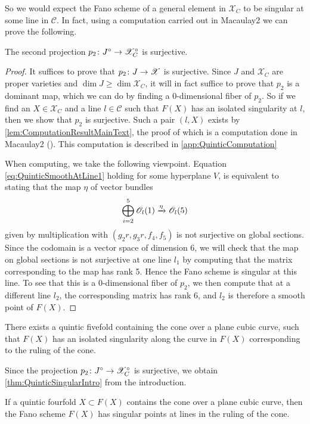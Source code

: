 So we would expect the Fano scheme of a general element in $\mathscr{X}_C$ to be singular at some line in $\mathcal{C}$. In fact, using a computation carried out in Macaulay2 we can prove the following.
\begin{proposition}
  \label{prop:QuinticDominant}
  The second projection $p_2 \colon J^\circ \to \mathscr{X}_C^\circ$ is surjective.
\end{proposition}
\begin{proof}
  It suffices to prove that $p_2 \colon J \to \mathscr{X}$ is surjective. Since $J$ and $\mathscr{X}_C$ are proper varieties and $\dim J \geq \dim \mathscr{X}_C$, it will in fact suffice to prove that $p_2$ is a dominant map, which we can do by finding a $0$-dimensional fiber of $p_2$. So if we find an $X \in \mathscr{X}_C$ and a line $l \in \mathcal{C}$ such that $F(X)$ has an isolated singularity at $l$, then we show that $p_2$ is surjective. Such a pair $(l,X)$ exists by \cref{lem:ComputationResultMainText}, the proof of which is a computation done in Macaulay2 (\cite{Macaulay2}). This computation is described in \cref{app:QuinticComputation}
  
  When computing, we take the following viewpoint. Equation \eqref{eq:QuinticSmoothAtLine1} holding for some hyperplane $V$, is equivalent to stating that the map $\eta$ of vector bundles
  \begin{equation}
  	\label{eq:QuinticSmoothVectorBundleCondition}
  	 \bigoplus_{i=2}^5\mathscr{O}_l(1) \xrightarrow{\eta} \mathscr{O}_l(5) 
  \end{equation}
  given by multiplication with $(g_2r,g_3r,f_4,f_5)$ is not surjective on global sections. Since the codomain is a vector space of dimension 6, we will check that the map on global sections is not surjective at one line $l_1$ by computing that the matrix corresponding to the map has rank 5. Hence the Fano scheme is singular at this line. To see that this is a $0$-dimensional fiber of $p_2$, we then compute that at a different line $l_2$, the corresponding matrix has rank 6, and $l_2$ is therefore a smooth point of $F(X)$.
\end{proof}

\begin{lemma}
	\label{lem:ComputationResultMainText}
	There exists a quintic fivefold containing the cone over a plane cubic curve, such that $F(X)$ has an isolated singularity along the curve in $F(X)$ corresponding to the ruling of the cone.
\end{lemma}

Since the projection $p_2 \colon J^\circ \to \mathscr{X}_C^\circ$ is surjective, we obtain \cref{thm:QuinticSingularIntro} from the introduction.
\begin{theorem}
	\label{thm:QuinticSingularMain}
	If a quintic fourfold $X \subset F(X)$ contains the cone over a plane cubic curve, then the Fano scheme $F(X)$ has singular points at lines in the ruling of the cone.
\end{theorem}

